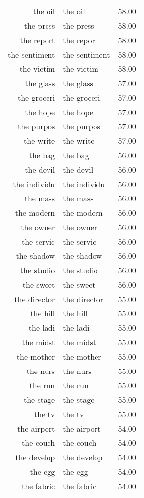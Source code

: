 \begin{table}[ht]
\begin{tabular}{rlr}
  the oil & the oil & 58.00 \\ 
  the press & the press & 58.00 \\ 
  the report & the report & 58.00 \\ 
  the sentiment & the sentiment & 58.00 \\ 
  the victim & the victim & 58.00 \\ 
  the glass & the glass & 57.00 \\ 
  the groceri & the groceri & 57.00 \\ 
  the hope & the hope & 57.00 \\ 
  the purpos & the purpos & 57.00 \\ 
  the write & the write & 57.00 \\ 
  the bag & the bag & 56.00 \\ 
  the devil & the devil & 56.00 \\ 
  the individu & the individu & 56.00 \\ 
  the mass & the mass & 56.00 \\ 
  the modern & the modern & 56.00 \\ 
  the owner & the owner & 56.00 \\ 
  the servic & the servic & 56.00 \\ 
  the shadow & the shadow & 56.00 \\ 
  the studio & the studio & 56.00 \\ 
  the sweet & the sweet & 56.00 \\ 
  the director & the director & 55.00 \\ 
  the hill & the hill & 55.00 \\ 
  the ladi & the ladi & 55.00 \\ 
  the midst & the midst & 55.00 \\ 
  the mother & the mother & 55.00 \\ 
  the nurs & the nurs & 55.00 \\ 
  the run & the run & 55.00 \\ 
  the stage & the stage & 55.00 \\ 
  the tv & the tv & 55.00 \\ 
  the airport & the airport & 54.00 \\ 
  the couch & the couch & 54.00 \\ 
  the develop & the develop & 54.00 \\ 
  the egg & the egg & 54.00 \\ 
  the fabric & the fabric & 54.00 \\ 

\end{tabular}
\end{table}
